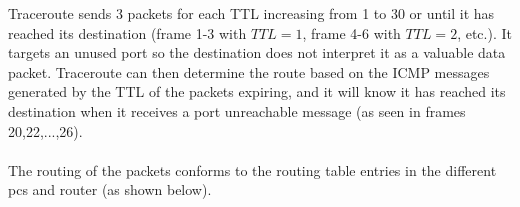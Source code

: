 

Traceroute sends 3 packets for each TTL increasing from 1 to 30 or until it has reached its destination (frame 1-3 with $TTL=1$, frame 4-6 with $TTL=2$, etc.). It targets an unused port so the destination does not interpret it as a valuable data packet. Traceroute can then determine the route based on the ICMP messages generated by the TTL of the packets expiring, and it will know it has reached its destination when it receives a port unreachable message (as seen in frames 20,22,...,26). \\ \\

The routing of the packets conforms to the routing table entries in the different pcs and router (as shown below). \\




